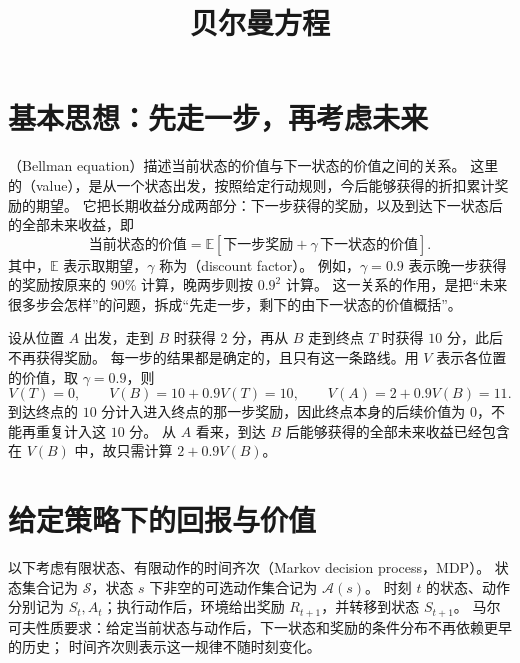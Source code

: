 \documentclass[UTF8]{ctexart}
\title{贝尔曼方程}
\author{}
\date{}
\begin{document}
\maketitle

\section{基本思想：先走一步，再考虑未来}
\label{sec:bellman-intuition}


（Bellman equation）描述当前状态的价值与下一状态的价值之间的关系。
这里的（value），是从一个状态出发，按照给定行动规则，今后能够获得的折扣累计奖励的期望。
它把长期收益分成两部分：下一步获得的奖励，以及到达下一状态后的全部未来收益，即
\[
  \boxed{\text{当前状态的价值}
  =\mathbb E\!\left[\text{下一步奖励}+\gamma\,\text{下一状态的价值}\right].}
\]
其中，$\mathbb E$ 表示取期望，$\gamma$ 称为（discount factor）。
例如，$\gamma=0.9$ 表示晚一步获得的奖励按原来的 $90\%$ 计算，晚两步则按 $0.9^2$ 计算。
这一关系的作用，是把“未来很多步会怎样”的问题，拆成“先走一步，剩下的由下一状态的价值概括”。

\begin{example}[两步到达终点]
\label{ex:bellman-two-step}
设从位置 $A$ 出发，走到 $B$ 时获得 $2$ 分，再从 $B$ 走到终点 $T$ 时获得 $10$ 分，此后不再获得奖励。
每一步的结果都是确定的，且只有这一条路线。用 $V$ 表示各位置的价值，取 $\gamma=0.9$，则
\[
  V(T)=0,\qquad
  V(B)=10+0.9V(T)=10,\qquad
  V(A)=2+0.9V(B)=11.
\]
到达终点的 $10$ 分计入进入终点的那一步奖励，因此终点本身的后续价值为 $0$，不能再重复计入这 $10$ 分。
从 $A$ 看来，到达 $B$ 后能够获得的全部未来收益已经包含在 $V(B)$ 中，故只需计算 $2+0.9V(B)$。
\end{example}

\section{给定策略下的回报与价值}
\label{sec:bellman-value}

以下考虑有限状态、有限动作的时间齐次（Markov decision process，MDP）。
状态集合记为 $\mathcal S$，状态 $s$ 下非空的可选动作集合记为 $\mathcal A(s)$。
时刻 $t$ 的状态、动作分别记为 $S_t,A_t$；执行动作后，环境给出奖励 $R_{t+1}$，并转移到状态 $S_{t+1}$。
马尔可夫性质要求：给定当前状态与动作后，下一状态和奖励的条件分布不再依赖更早的历史；
时间齐次则表示这一规律不随时刻变化。
\end{document}
